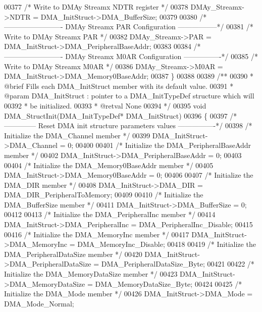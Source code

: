 \begin{DoxyCode}
00377   \textcolor{comment}{/* Write to DMAy Streamx NDTR register */}
00378   DMAy\_Streamx->NDTR = DMA\_InitStruct->DMA\_BufferSize;
00379 
00380   \textcolor{comment}{/*------------------------- DMAy Streamx PAR Configuration -----------------*/}
00381   \textcolor{comment}{/* Write to DMAy Streamx PAR */}
00382   DMAy\_Streamx->PAR = DMA\_InitStruct->DMA\_PeripheralBaseAddr;
00383 
00384   \textcolor{comment}{/*------------------------- DMAy Streamx M0AR Configuration ----------------*/}
00385   \textcolor{comment}{/* Write to DMAy Streamx M0AR */}
00386   DMAy\_Streamx->M0AR = DMA\_InitStruct->DMA\_Memory0BaseAddr;
00387 \}
00388 
00389 \textcolor{comment}{/**}
00390 \textcolor{comment}{  * @brief  Fills each DMA\_InitStruct member with its default value.}
00391 \textcolor{comment}{  * @param  DMA\_InitStruct : pointer to a DMA\_InitTypeDef structure which will }
00392 \textcolor{comment}{  *         be initialized.}
00393 \textcolor{comment}{  * @retval None}
00394 \textcolor{comment}{  */}
00395 \textcolor{keywordtype}{void} DMA_StructInit(DMA\_InitTypeDef* DMA\_InitStruct)
00396 \{
00397   \textcolor{comment}{/*-------------- Reset DMA init structure parameters values ----------------*/}
00398   \textcolor{comment}{/* Initialize the DMA\_Channel member */}
00399   DMA\_InitStruct->DMA_Channel = 0;
00400 
00401   \textcolor{comment}{/* Initialize the DMA\_PeripheralBaseAddr member */}
00402   DMA\_InitStruct->DMA_PeripheralBaseAddr = 0;
00403 
00404   \textcolor{comment}{/* Initialize the DMA\_Memory0BaseAddr member */}
00405   DMA\_InitStruct->DMA_Memory0BaseAddr = 0;
00406 
00407   \textcolor{comment}{/* Initialize the DMA\_DIR member */}
00408   DMA\_InitStruct->DMA_DIR = DMA_DIR_PeripheralToMemory;
00409 
00410   \textcolor{comment}{/* Initialize the DMA\_BufferSize member */}
00411   DMA\_InitStruct->DMA_BufferSize = 0;
00412 
00413   \textcolor{comment}{/* Initialize the DMA\_PeripheralInc member */}
00414   DMA\_InitStruct->DMA_PeripheralInc = DMA_PeripheralInc_Disable;
00415 
00416   \textcolor{comment}{/* Initialize the DMA\_MemoryInc member */}
00417   DMA\_InitStruct->DMA_MemoryInc = DMA_MemoryInc_Disable;
00418 
00419   \textcolor{comment}{/* Initialize the DMA\_PeripheralDataSize member */}
00420   DMA\_InitStruct->DMA_PeripheralDataSize = DMA_PeripheralDataSize_Byte;
00421 
00422   \textcolor{comment}{/* Initialize the DMA\_MemoryDataSize member */}
00423   DMA\_InitStruct->DMA_MemoryDataSize = DMA_MemoryDataSize_Byte;
00424 
00425   \textcolor{comment}{/* Initialize the DMA\_Mode member */}
00426   DMA\_InitStruct->DMA_Mode = DMA_Mode_Normal;

\end{DoxyCode}
